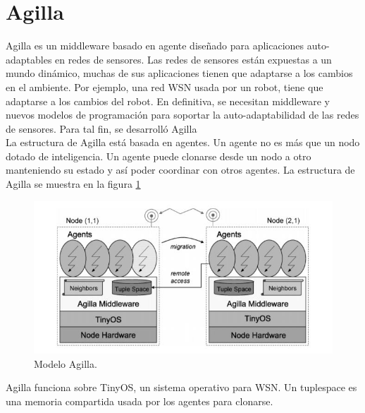 \documentclass[12pt, twoside]{book}
\begin{document}
\section{Agilla}
Agilla\cite{agilla} es un middleware basado en agente diseñado para aplicaciones auto-adaptables en redes de sensores. Las redes de sensores están expuestas a un mundo dinámico, muchas de sus aplicaciones tienen que adaptarse a los cambios en el ambiente. Por ejemplo, una red WSN usada por un robot, tiene que adaptarse a los cambios del robot. En definitiva, se necesitan middleware y nuevos modelos de programación para soportar la auto-adaptabilidad de las redes de sensores. Para tal fin, se desarrolló Agilla\\
La estructura de Agilla está basada en agentes. Un agente no es más que un nodo dotado de inteligencia. Un agente puede clonarse desde un nodo a otro manteniendo su estado y así poder coordinar con otros agentes. La estructura de Agilla se muestra en la figura \ref{agilla}
\begin{figure}[H]
\centering
\includegraphics[scale=0.5]{images/agilla}
\caption{Modelo Agilla.}\label{agilla}
\end{figure}
Agilla funciona sobre TinyOS, un sistema operativo para WSN. Un tuplespace es una memoria compartida usada por los agentes para clonarse.
\end{document}
